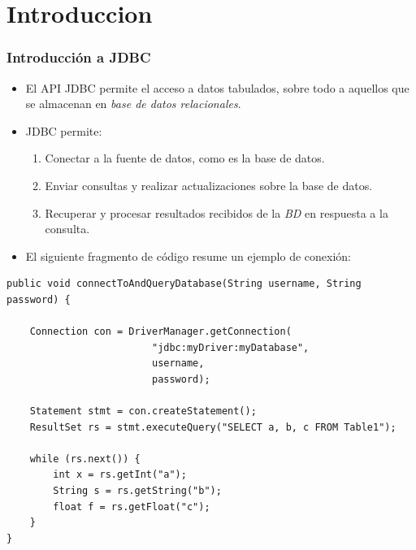 \documentclass{beamer}
\begin{document}
\section{Introduccion}
\begin{frame}[fragile]
\frametitle{Introducción a JDBC}
\begin{scriptsize}
\begin{itemize}[<+->]
\item El API \alert{JDBC} permite el acceso a datos tabulados, sobre todo a aquellos que se almacenan en \emph{base de datos relacionales}.
\item JDBC permite:
\begin{enumerate}
\item Conectar a la fuente de datos, como es la base de datos.
\item Enviar consultas y realizar actualizaciones sobre la base de datos.
\item Recuperar y procesar resultados recibidos de la \emph{BD} en respuesta a la consulta.
\end{enumerate}
\item El siguiente fragmento de código resume un ejemplo de conexión:
\end{itemize}
\end{scriptsize}
\pause
\begin{tiny}
\begin{verbatim}
public void connectToAndQueryDatabase(String username, String password) {

    Connection con = DriverManager.getConnection(
                         "jdbc:myDriver:myDatabase",
                         username,
                         password);

    Statement stmt = con.createStatement();
    ResultSet rs = stmt.executeQuery("SELECT a, b, c FROM Table1");

    while (rs.next()) {
        int x = rs.getInt("a");
        String s = rs.getString("b");
        float f = rs.getFloat("c");
    }
}
\end{verbatim}
\end{tiny}
\end{frame}
\end{document}
